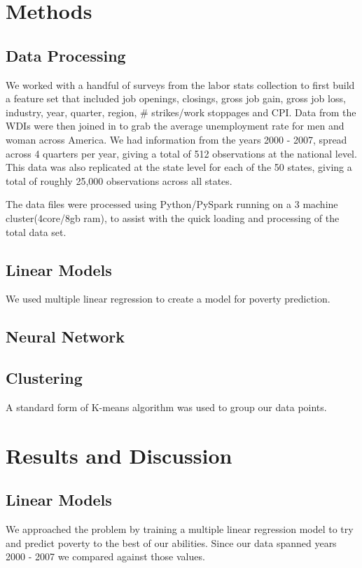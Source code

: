 \documentclass[11pt,letterpaper]{article}
\begin{document}
\section{Methods}

\subsection{Data Processing}
\label{ssec:dataproc}

We worked with a handful of surveys from the labor stats collection to first build a feature set that included job openings, closings, gross job gain, gross job loss, industry, year, quarter, region, \# strikes/work stoppages and CPI. Data from the WDIs were then joined in to grab the average unemployment rate for men and woman across America. We had information from the years 2000 - 2007, spread across 4 quarters per year, giving a total of 512 observations at the national level. This data was also replicated at the state level for each of the 50 states, giving a total of roughly 25,000 observations across all states.

The data files were processed using Python/PySpark running on a 3 machine cluster(4core/8gb ram), to assist with the quick loading and processing of the total data set. 

\subsection{Linear Models}
\label{ssec:lm}

We used multiple linear regression to create a model for poverty prediction. 

\subsection{Neural Network}
\label{ssec:nn}

\subsection{Clustering}
\label{ssec:cluster}

A standard form of K-means algorithm was used to group our data points. 


\section{Results and Discussion}

\subsection{Linear Models}
\label{ssec:linearResults}
We approached the problem by training a multiple linear regression model to try and predict poverty to the best of our abilities. Since our data spanned years 2000 - 2007 we compared against those values. 
\end{document}
